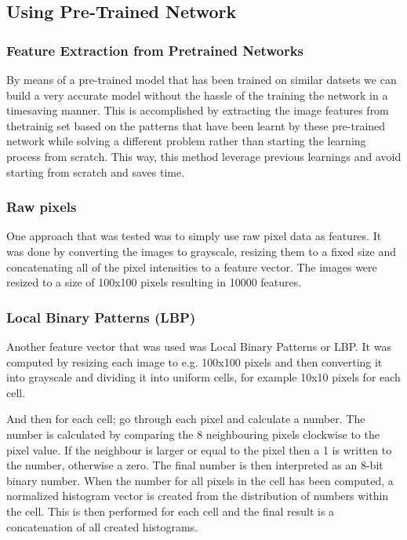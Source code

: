 \documentclass[doc/report.tex]{subfiles}
\begin{document}
\subsection{Using Pre-Trained Network}
\subsubsection{Feature Extraction from Pretrained Networks}
By means of a pre-trained model that has been trained on similar datsets we can build a very accurate model without the hassle of the training the network in a timesaving manner. This is accomplished by extracting the image features from thetrainig set based on the patterns that have been learnt by these pre-trained network while solving a different problem rather than starting the learning process from scratch. This way, this method leverage previous learnings and avoid starting from scratch and saves time.  


\subsubsection{Raw pixels}
One approach that was tested was to simply use raw pixel data as features. It
was done by converting the images to grayscale, resizing them to a fixed size
and concatenating all of the pixel intensities to a feature vector. The images
were resized to a size of 100x100 pixels resulting in 10000 features.

\subsubsection{Local Binary Patterns (LBP)}
Another feature vector that was used was Local Binary Patterns or LBP. It was
computed by resizing each image to e.g. 100x100 pixels and then converting it
into grayscale and dividing it into uniform cells, for example 10x10 pixels for
each cell.

And then for each cell; go through each pixel and calculate a number. The
number is calculated by comparing the 8 neighbouring pixels clockwise to the
pixel value. If the neighbour is larger or equal to the pixel then a 1 is
written to the number, otherwise a zero. The final number is then interpreted
as an 8-bit binary number. When the number for all pixels in the cell has been
computed, a normalized histogram vector is created from the distribution of
numbers within the cell. This is then performed for each cell and the final
result is a concatenation of all created histograms.
\end{document}
